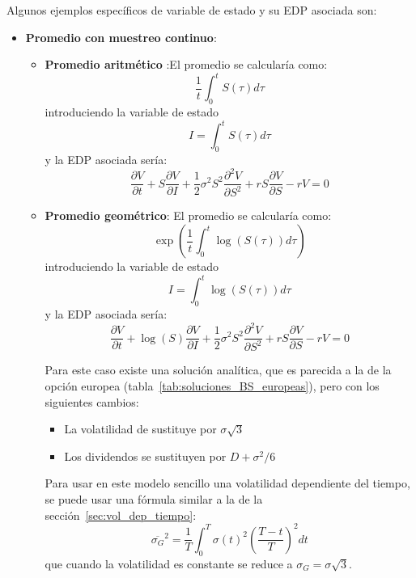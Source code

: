 Algunos ejemplos específicos de variable de estado y su EDP asociada son:
\begin{itemize}
    \item \textbf{Promedio con muestreo continuo}:
    \begin{itemize}
        \item \textbf{Promedio aritmético} :El promedio se calcularía como:
        \begin{equation*}
            \frac{1}{t}\int_{0}^{t} S(\tau) d\tau
        \end{equation*}
        introduciendo la variable de estado
        \begin{equation*}
            \boxed{I = \int_{0}^{t} S(\tau) d\tau}
        \end{equation*}
        y la EDP asociada sería:
        \begin{equation*}
            \boxed{\frac{\partial V}{\partial t} + S \frac{\partial V}{\partial I}  +  \frac{1}{2} \sigma^2 S^2 \frac{\partial^2 V}{\partial S^2} + r S \frac{\partial V}{\partial S} - rV = 0}
        \end{equation*}

        \item \textbf{Promedio geométrico}: El promedio se calcularía como:
        \begin{equation*}
            \exp\left(\frac{1}{t}\int_{0}^{t} \log(S(\tau)) d\tau\right)
        \end{equation*}
        introduciendo la variable de estado
        \begin{equation*}
            \boxed{I = \int_{0}^{t} \log(S(\tau)) d\tau}
        \end{equation*}
        y la EDP asociada sería:
        \begin{equation*}
            \boxed{\frac{\partial V}{\partial t} + \log(S) \frac{\partial V}{\partial I}  +  \frac{1}{2} \sigma^2 S^2 \frac{\partial^2 V}{\partial S^2} + r S \frac{\partial V}{\partial S} - rV = 0}
        \end{equation*}

        Para este caso existe una solución analítica, que es parecida a la de la opción europea (tabla~\ref{tab:soluciones_BS_europeas}), pero con los siguientes cambios:
        \begin{itemize}
            \item La volatilidad de sustituye por $\boxed{\sigma\sqrt{3}}$
            \item Los dividendos se sustituyen por $\boxed{D+\sigma^2/6}$
        \end{itemize}
        Para usar en este modelo sencillo una volatilidad dependiente del tiempo, se puede usar una fórmula similar a la de la sección~\ref{sec:vol_dep_tiempo}:
        \begin{equation*}
            \boxed{\overline{\sigma_G}^2 = \frac{1}{T} \int_0^T \sigma(t)^2 \left( \frac{T-t}{T} \right)^2 dt}
        \end{equation*}
        que cuando la volatilidad es constante se reduce a $\sigma_G = \sigma\sqrt{3}$.
    \end{itemize}


\end{itemize}
